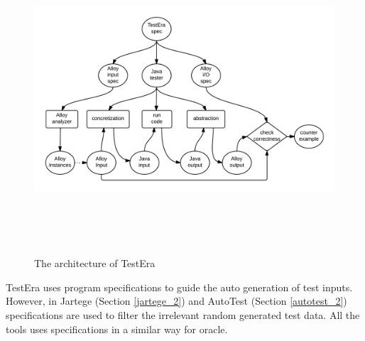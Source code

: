 \begin{figure}[h]
	\centering
	\centerline{\includegraphics[width=16cm, height=11.5cm]{chapter2/TestEra.png}}
	\caption{The architecture of TestEra ~\cite{marinov2001testera}}
	\label{fig:testera}
\end{figure}


TestEra uses program specifications to guide the auto generation of test inputs. However, in Jartege (Section \ref{jartege_2}) and AutoTest (Section \ref{autotest_2}) specifications are used to filter the irrelevant random generated test data. All the tools uses specifications in a similar way for oracle. 



